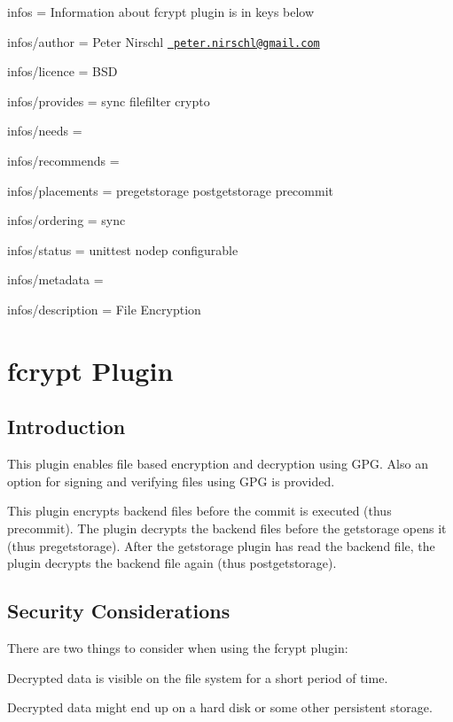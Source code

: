 
\begin{DoxyItemize}
\item infos = Information about fcrypt plugin is in keys below
\item infos/author = Peter Nirschl \href{mailto:peter.nirschl@gmail.com}{\texttt{ peter.\+nirschl@gmail.\+com}}
\item infos/licence = B\+SD
\item infos/provides = sync filefilter crypto
\item infos/needs =
\item infos/recommends =
\item infos/placements = pregetstorage postgetstorage precommit
\item infos/ordering = sync
\item infos/status = unittest nodep configurable
\item infos/metadata =
\item infos/description = File Encryption
\end{DoxyItemize}\hypertarget{autotoc_md207_src_plugins_fcrypt_README_md}{}\section{fcrypt Plugin}\label{autotoc_md207_src_plugins_fcrypt_README_md}
\hypertarget{autotoc_md207_autotoc_md208}{}\subsection{Introduction}\label{autotoc_md207_autotoc_md208}
This plugin enables file based encryption and decryption using G\+PG. Also an option for signing and verifying files using G\+PG is provided.

This plugin encrypts backend files before the commit is executed (thus {\ttfamily precommit}). The plugin decrypts the backend files before the getstorage opens it (thus {\ttfamily pregetstorage}). After the getstorage plugin has read the backend file, the plugin decrypts the backend file again (thus {\ttfamily postgetstorage}).\hypertarget{autotoc_md207_autotoc_md209}{}\subsection{Security Considerations}\label{autotoc_md207_autotoc_md209}
There are two things to consider when using the {\ttfamily fcrypt} plugin\+:


\begin{DoxyEnumerate}
\item Decrypted data is visible on the file system for a short period of time.
\item Decrypted data might end up on a hard disk or some other persistent storage.
\end{DoxyEnumerate}


